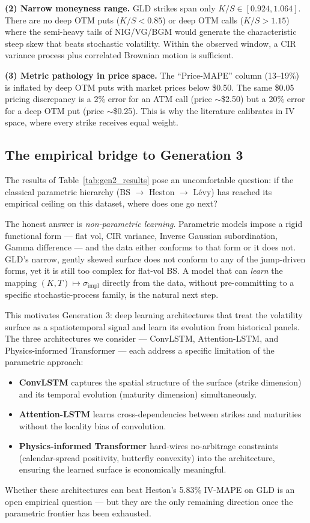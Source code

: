 \documentclass[12pt, a4paper]{article}
\begin{document}
\textbf{(2) Narrow moneyness range.}
GLD strikes span only $K/S \in [0.924, 1.064]$.  There are no deep OTM
puts ($K/S < 0.85$) or deep OTM calls ($K/S > 1.15$) where the semi-heavy
tails of NIG/VG/BGM would generate the characteristic steep skew that
beats stochastic volatility.  Within the observed window, a CIR variance
process plus correlated Brownian motion is sufficient.

\textbf{(3) Metric pathology in price space.}
The ``Price-MAPE'' column (13--19\%) is inflated by deep OTM puts with
market prices below \$0.50.  The same \$0.05 pricing discrepancy is a 2\%
error for an ATM call (price $\sim$\$2.50) but a 20\% error for a deep
OTM put (price $\sim$\$0.25).  This is why the literature calibrates in
IV space, where every strike receives equal weight.

\subsection{The empirical bridge to Generation 3}

The results of Table~\ref{tab:gen2_results} pose an uncomfortable question:
if the classical parametric hierarchy (BS $\to$ Heston $\to$ Lévy) has
reached its empirical ceiling on this dataset, where does one go next?

The honest answer is \emph{non-parametric learning}.  Parametric models
impose a rigid functional form --- flat vol, CIR variance, Inverse
Gaussian subordination, Gamma difference --- and the data either conforms
to that form or it does not.  GLD's narrow, gently skewed surface does not
conform to any of the jump-driven forms, yet it is still too complex for
flat-vol BS.  A model that can \emph{learn} the mapping
$(K, T) \mapsto \sigma_{\text{impl}}$ directly from the data, without
pre-committing to a specific stochastic-process family, is the natural
next step.

This motivates Generation 3: deep learning architectures that treat the
volatility surface as a spatiotemporal signal and learn its evolution
from historical panels.  The three architectures we consider --- ConvLSTM,
Attention-LSTM, and Physics-informed Transformer --- each address a
specific limitation of the parametric approach:
\begin{itemize}
  \item \textbf{ConvLSTM} captures the spatial structure of the surface
    (strike dimension) and its temporal evolution (maturity dimension)
    simultaneously.
  \item \textbf{Attention-LSTM} learns cross-dependencies between strikes
    and maturities without the locality bias of convolution.
  \item \textbf{Physics-informed Transformer} hard-wires no-arbitrage
    constraints (calendar-spread positivity, butterfly convexity) into the
    architecture, ensuring the learned surface is economically meaningful.
\end{itemize}

Whether these architectures can beat Heston's 5.83\% IV-MAPE on GLD is
an open empirical question --- but they are the only remaining direction
once the parametric frontier has been exhausted.
\end{document}
